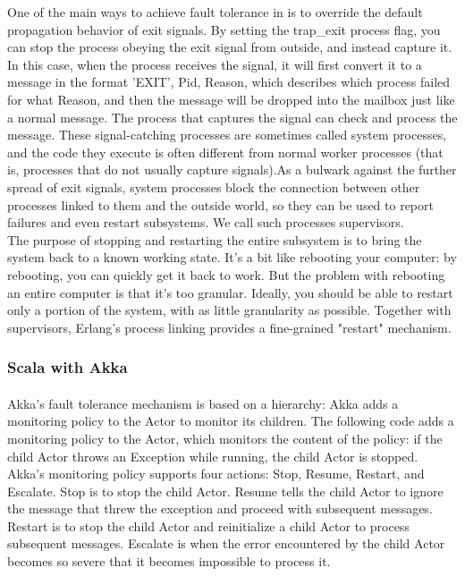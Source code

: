 \documentclass{article}
\begin{document}
One of the main ways to achieve fault tolerance in is to override the default propagation behavior of exit signals.  By setting the trap\_exit process flag, you can stop the process obeying the exit signal from outside, and instead capture it. In this case, when the process receives the signal, it will first convert it to a message in the format {'EXIT', Pid, Reason}, which describes which process failed for what Reason, and then the message will be dropped into the mailbox just like a normal message. The process that captures the signal can check and process the message. These signal-catching processes are sometimes called system processes, and the code they execute is often different from normal worker processes (that is, processes that do not usually capture signals).As a bulwark against the further spread of exit signals, system processes block the connection between other processes linked to them and the outside world, so they can be used to report failures and even restart subsystems. We call such processes supervisors.\\

The purpose of stopping and restarting the entire subsystem is to bring the system back to a known working state. It's a bit like rebooting your computer: by rebooting, you can quickly get it back to work. But the problem with rebooting an entire computer is that it's too granular. Ideally, you should be able to restart only a portion of the system, with as little granularity as possible. Together with supervisors, Erlang's process linking provides a fine-grained "restart" mechanism.\\

\subsubsection{Scala with Akka}\vspace{16pt}
\paragraph{}\vspace{11pt}\justifying
Akka's fault tolerance mechanism is based on a hierarchy: Akka adds a monitoring policy to the Actor to monitor its children. The following code adds a monitoring policy to the Actor, which monitors the content of the policy: if the child Actor throws an Exception while running, the child Actor is stopped.\\

Akka's monitoring policy supports four actions: Stop, Resume, Restart, and Escalate. Stop is to stop the child Actor. Resume tells the child Actor to ignore the message that threw the exception and proceed with subsequent messages. Restart is to stop the child Actor and reinitialize a child Actor to process subsequent messages. Escalate is when the error encountered by the child Actor becomes so severe that it becomes impossible to process it.\\
\end{document}
